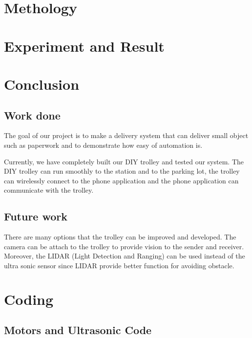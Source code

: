 \documentclass[12pt]{article}
\begin{document}
\section{Methology} \label{sec:methology}

\section{Experiment and Result} \label{sec:experiment}

\section{Conclusion} \label{sec:conclusion}

\subsection{Work done}

The goal of our project is to make a delivery system that can deliver small object such as paperwork and to demonstrate how easy of automation is.\par
Currently, we have completely built our DIY trolley and tested our system. The DIY trolley can run smoothly to the station and to the parking lot, the trolley can wirelessly connect to the phone application and the phone application can communicate with the trolley.

\subsection{Future work}

There are many options that the trolley can be improved and developed. The camera can be attach to the trolley to provide vision to the sender and receiver. Moreover, the LIDAR (Light Detection and Ranging) can be used instead of the ultra sonic sensor since LIDAR provide better function for avoiding obstacle. 

\nocite{*}



\newpage

\appendix
\section{Coding} \label{sec:coding}
\subsection{Motors and Ultrasonic Code} \label{sub:}
\texttt{}
\end{document}
